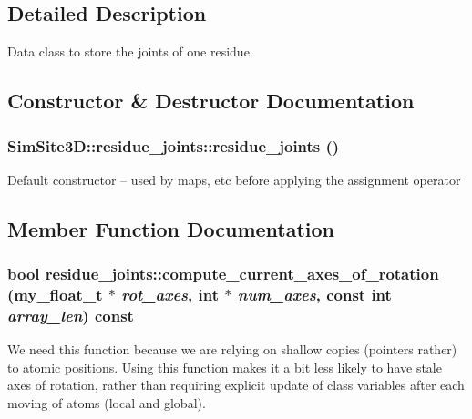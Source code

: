 \subsection{Detailed Description}
Data class to store the joints of one residue. 



\subsection{Constructor \& Destructor Documentation}
\subsubsection{\setlength{\rightskip}{0pt plus 5cm}SimSite3D::residue\_\-joints::residue\_\-joints ()\hspace{0.3cm}{\tt  [inline]}}\label{classSimSite3D_1_1residue__joints_1a5a5d456651261c8cfa2f1588f829de}


Default constructor -- used by maps, etc before applying the assignment operator 

\subsection{Member Function Documentation}
\subsubsection{\setlength{\rightskip}{0pt plus 5cm}bool residue\_\-joints::compute\_\-current\_\-axes\_\-of\_\-rotation (my\_\-float\_\-t $\ast$ {\em rot\_\-axes}, int $\ast$ {\em num\_\-axes}, const int {\em array\_\-len}) const}\label{classSimSite3D_1_1residue__joints_3a4671e36329ec606cfb9b1c91c7b334}


We need this function because we are relying on shallow copies (pointers rather) to atomic positions. Using this function makes it a bit less likely to have stale axes of rotation, rather than requiring explicit update of class variables after each moving of atoms (local and global). 
